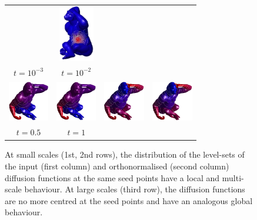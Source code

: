 \documentclass[acmtog,authorversion]{acmart}
\begin{document}
\begin{figure}[t]
\begin{tabular}{cc|cc}
&\includegraphics[height=70pt]{FMAP-images/monkey-duffusion-support-3-ORTH.jpg}\\
$t=10^{-3}$ &$t=10^{-2}$ & &\\
\hline
\includegraphics[height=50pt]{FMAP-images/monkey-large-scale-1-INPUT.jpg}
&\includegraphics[height=50pt]{FMAP-images/monkey-large-scale-2-INPUT.jpg}
&\includegraphics[height=50pt]{FMAP-images/monkey-large-scale-1-ORTH.jpg}
&\includegraphics[height=50pt]{FMAP-images/monkey-large-scale-2-ORTH.jpg}\\
$t=0.5$ &$t=1$ & &\\
\hline
\end{tabular}
\caption{At small scales (1st, 2nd rows), the distribution of the level-sets of the input (first column) and orthonormalised (second column) diffusion functions at the same seed points have a local and multi-scale behaviour. At large scales (third row), the diffusion functions are no more centred at the seed points and have an analogous global behaviour.\label{fig:MONKEY-DIFFUSION}}
\end{figure}
%
\end{document}

